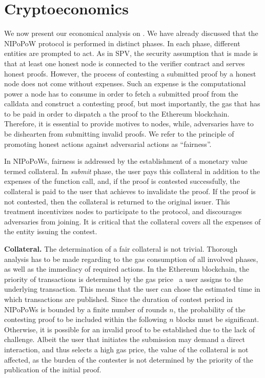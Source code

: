 \section{Cryptoeconomics}

We now present our economical analysis on \name. We have
already discussed that the NIPoPoW protocol is performed in distinct phases. In
each phase, different entities are prompted to act. As in SPV, the security
assumption that is made is that at least one honest node is connected to the
verifier contract and serves honest proofs. However, the process of contesting
a submitted proof by a honest node does not come without expenses.  Such an
expense is the computational power a node has to consume in order to fetch a
submitted proof from the calldata and construct a contesting proof, but most
importantly, the gas that has to be paid in order to dispatch a the proof to
the Ethereum blockchain. Therefore, it is essential to provide motives to
nodes, while, adversaries have to be dishearten from
submitting invalid proofs.  We refer to the principle of promoting honest
actions against adversarial actions as ``fairness''.

In NIPoPoWs, fairness is addressed by the establishment of a monetary value
termed collateral. In \emph{submit} phase, the user pays this collateral in
addition to the expenses of the function call, and, if the proof is contested
successfully, the collateral is paid to the user that achieves to invalidate
the proof. If the proof is not contested, then the collateral is returned to
the original issuer. This treatment incentivizes nodes to participate to the
protocol, and discourages adversaries from joining. It is critical that the
collateral covers all the expenses of the entity issuing the contest.

\noindent \textbf{Collateral.} The determination of a fair collateral is not
trivial. Thorough analysis has to be made regarding to the gas consumption of
all involved phases, as well as the immediacy of required actions. In the
Ethereum blockchain, the priority of transactions is determined by the gas
price~\cite{wood} a user assigns to the underlying transaction. This means that
the user can chose the estimated time in which transactions are published.
Since the duration of contest period in NIPoPoWs is bounded by a finite number
of rounds $n$, the probability of the contesting proof to be included within the
following $n$ blocks must be significant. Otherwise, it is possible for an invalid
proof to be established due to the lack of challenge. Albeit the user that
initiates the submission may demand a direct interaction, and thus selects a
high gas price, the value of the collateral is not affected, as the burden
of the contester is not determined by the priority of the publication of the initial
proof.

